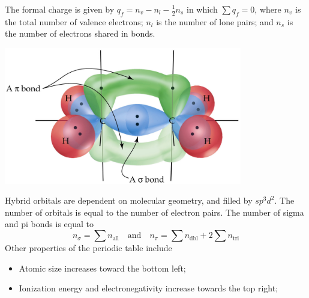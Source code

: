\documentclass{tufte-book}
\begin{document}
The formal charge is given by $q_f = n_v - n_l - \frac{1}{2} n_s$ in which $\sum q_f = 0$, where $n_v$ is the total number of valence electrons; $n_l$ is the number of lone pairs; and $n_s$ is the number of electrons shared in bonds.
%
\begin{marginfigure}
\begin{center}
  \includegraphics[width=0.78\textwidth]{bonds} \phantom{mmmm}
\end{center}
\end{marginfigure}
%
\bigskip
Hybrid orbitals are dependent on molecular geometry, and filled by $sp^3d^2$. The number of orbitals is equal to the number of electron pairs. The number of sigma and pi bonds is equal to \begin{equation}
  n_\sigma = \sum n_\text{all} \quad\text{and}\quad n_\pi = \sum n_\text{dbl} + 2 \sum n_\text{tri}
\end{equation}
Other properties of the periodic table include \begin{itemize}
  \item Atomic size increases toward the bottom left;
  \item Ionization energy and electronegativity increase towards the top right;
\end{itemize}
\end{document}

